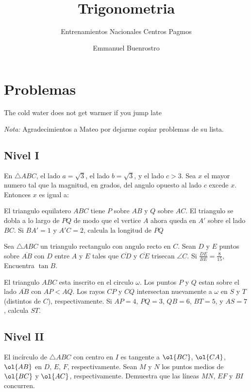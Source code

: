 \documentclass[11pt]{scrartcl}
\title {Trigonometria}
\subtitle {Entrenamientos Nacionales Centros Pagmos}
\author{Emmanuel Buenrostro}
\begin{document}
\maketitle

\section{Problemas}
\epigraph{The cold water does not get warmer if you jump late}{ }

\textit{Nota:} Agradecimientos a Mateo por dejarme copiar problemas de su lista.
\subsection{Nivel I}

\begin{problem} %
    En $\triangle ABC$, el lado $a=\sqrt{3}$, el lado $b=\sqrt{3}$, y el lado $c>3$. Sea $x$ el mayor numero tal que la magnitud, en grados, del angulo opuesto al lado $c$ excede $x$. Entonces $x$ es igual a:
\end{problem}




\begin{problem} %
    El triangulo equilatero $ABC$ tiene $P$ sobre $AB$ y $Q$ sobre $AC$. El triangulo se dobla a lo largo de $PQ$ de modo que el vertice $A$ ahora queda en $A'$ sobre el lado $BC$. Si $BA'=1$ y $A'C=2$, calcula la longitud de  $PQ$
\end{problem}

\begin{problem} %
Sea $\triangle ABC$ un triangulo rectangulo con angulo recto en $C$. Sean $D$ y $E$ puntos sobre $\overline{AB}$ con $D$ entre $A$ y $E$ tales que $\overline{CD}$ y $\overline{CE}$ trisecan $\angle C$. Si $\frac{DE}{BE}=\frac{8}{15}$, Encuentra $\tan B$.
\end{problem}

\begin{problem} %
    El triangulo $ABC$ esta inscrito en el circulo $\omega$. Los puntos $P$ y $Q$ estan sobre el lado $\overline{AB}$ con $AP<AQ$. Los rayos $CP$ y $CQ$ intersectan nuevamente a $\omega$ en $S$ y $T$ (distintos de $C$), respectivamente. Si $AP=4$, $PQ=3$, $QB=6$, $BT=5$, y $AS=7$, calcula $ST$.
\end{problem}
\subsection{Nivel II}
\begin{problem}%

	El incírculo de $\triangle ABC$ con centro en $I$ es tangente a $\ol{BC}$, $\ol{CA}$, $\ol{AB}$ en $D$, $E$, $F$, respectivamente. Sean $M$
	y $N$ los puntos medios de $\ol{BC}$ y $\ol{AC}$, respectivamente. Demuestra que las líneas $MN$, $EF$ y $BI$ concurren.

\end{problem}
\end{document}

